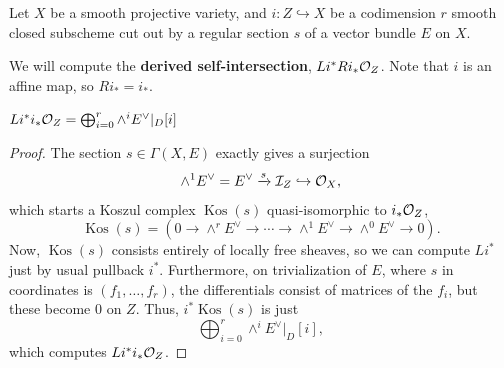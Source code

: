\documentclass[12pt]{article}
\DeclareMathOperator{\Kos}{Kos}
\begin{document}
Let $X$ be a smooth projective variety, and $i: Z\hookrightarrow X$ be a codimension $r$ smooth closed subscheme cut out by a regular section $s$ of a vector bundle $E$ on $X$.

We will compute the \textbf{derived self-intersection}, $Li^* Ri_* \mathcal{O}_Z$. Note that $i$ is an affine map, so $Ri_*=i_*$.

\begin{prop}
    $Li^*i_* \mathcal{O}_Z = \bigoplus_{i=0}^r \wedge^i E^\vee|_D[i]$
\end{prop}

\begin{proof}
    The section $s\in \Gamma(X,E)$ exactly gives a surjection
    \[\wedge^1 E^\vee=E^\vee \xrightarrow{s} \mathcal{I}_Z \hookrightarrow \mathcal{O}_X,\]
    which starts a Koszul complex $\Kos(s)$ quasi-isomorphic to $i_* \mathcal{O}_Z$,
    \[\Kos(s) = \left(0\to \wedge^r E^\vee \to \cdots \to \wedge^1 E^\vee \to \wedge^0 E^\vee \to 0\right).\]
    Now, $\Kos(s)$ consists entirely of locally free sheaves, so we can compute $Li^*$ just by usual pullback $i^*$. Furthermore, on trivialization of $E$, where $s$ in coordinates is $(f_1,\dots,f_r)$, the differentials consist of matrices of the $f_i$, but these become 0 on $Z$. Thus, $i^* \Kos(s)$ is just
    \[\bigoplus_{i=0}^r \wedge^i E^\vee|_D[i],\]
    which computes $Li^* i_* \mathcal{O}_Z$.
\end{proof}
\end{document}
